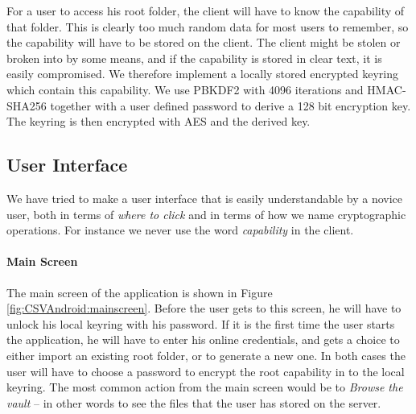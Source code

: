 \documentclass[pdftex,english,10pt,b5paper,twoside]{book}
\begin{document}
For a user to access his root folder, the client will have to know the
capability of that folder. This is clearly too much random data for most users
to remember, so the capability will have to be stored on the client.  The
client might be stolen or broken into by some means, and if the capability is
stored in clear text, it is easily compromised. We therefore implement a
locally stored encrypted keyring which contain this capability. We use
\ac{PBKDF2} with 4096 iterations and \ac{HMAC}-\ac{SHA}256 together with a user
defined password to derive a 128 bit encryption key. The keyring is then
encrypted with \ac{AES} and the derived key.

\subsection{User Interface}

We have tried to make a user interface that is easily understandable by a
novice user, both in terms of \emph{where to click} and in terms of how we name
cryptographic operations. For instance we never use the word \emph{capability}
in the client.

\paragraph{Main Screen}

The main screen of the application is shown in Figure
\ref{fig:CSVAndroid:mainscreen}. Before the user gets to this screen, he will
have to unlock his local keyring with his password. If it is the first time the
user starts the application, he will have to enter his online credentials, and
gets a choice to either import an existing root folder, or to generate a new
one. In both cases the user will have to choose a password to encrypt the root
capability in to the local keyring. The most common action from the main screen
would be to \emph{Browse the vault} -- in other words to see the files that the
user has stored on the server.
\end{document}
